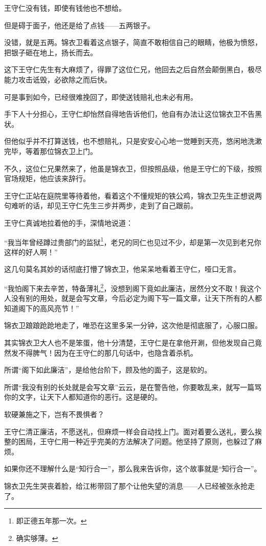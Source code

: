 \begin{multicols}{\theparacolNo}
王守仁没有钱，即使有钱他也不想给。

但是碍于面子，他还是给了点钱——五两银子。

没错，就是五两。锦衣卫看着这点银子，简直不敢相信自己的眼睛，他极为愤怒，把银子砸在地上，扬长而去。

这下王守仁先生有大麻烦了，得罪了这位仁兄，他回去之后自然会颠倒黑白，极尽能力攻击诋毁，必欲除之而后快。

可是事到如今，已经很难挽回了，即使送钱赔礼也未必有用。

手下人十分担心，王守仁却怡然自得地告诉他们，他自有办法让这位锦衣卫不告黑状。

但他似乎并不打算送钱，也不想赔礼，只是安安心心地一觉睡到天亮，悠闲地洗漱完毕，等着那位锦衣卫上门。

不久，这位仁兄果然来了，他虽是锦衣卫，但按照品级，他是王守仁的下级，按照官场规矩，他应该来辞行。

王守仁正站在庭院里等待着他，看着这个不懂规矩的铁公鸡，锦衣卫先生正想说两句难听的话，却见王守仁先生三步并两步，走到了自己跟前。

王守仁真诚地拉着他的手，深情地说道：

“我当年曾经蹲过贵部门的监狱\footnote{即正德五年那一次。}，老兄的同仁也见过不少，却是第一次见到老兄你这样的好人啊！”

这几句莫名其妙的话彻底打懵了锦衣卫，他呆呆地看着王守仁，哑口无言。

“我怕阁下来去辛苦，特备薄礼\footnote{确实够薄。}，没想到阁下竟如此廉洁，居然分文不取！我这个人没有别的用处，就是会写文章，今后必定为阁下写一篇文章，让天下所有的人都知道阁下的高风亮节！”

锦衣卫踉踉跄跄地走了，唯恐在这里多呆一分钟，这次他是彻底服了，心服口服。

其实锦衣卫大人也不是笨蛋，他十分清楚，王守仁是在拿他开涮，但他发现自己竟然发不得脾气！因为在王守仁的那几句话中，也隐含着杀机。

所谓“阁下如此廉洁”，是给他台阶下，顾及他的面子，这是软的。

所谓“我没有别的长处就是会写文章”云云，是在警告他，你要敢乱来，就写一篇骂你的文字，让天下人都知道你的恶行。这是硬的。

软硬兼施之下，岂有不畏惧者？

王守仁清正廉洁，不愿送礼，但麻烦一样会自动找上门。面对着要么送礼，要么挨整的困局，王守仁用一种近乎完美的方法解决了问题。他坚持了原则，也躲过了麻烦。

如果你还不理解什么是“知行合一”，那么我来告诉你，这个故事就是“知行合一”。

锦衣卫先生哭丧着脸，给江彬带回了那个让他失望的消息——人已经被张永抢走了。


\end{multicols}
